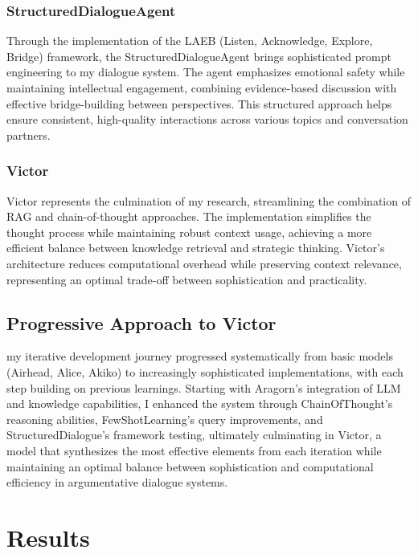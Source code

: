 \documentclass[11pt]{article}
\begin{document}
\subsubsection{StructuredDialogueAgent}
Through the implementation of the LAEB (Listen, Acknowledge, Explore, Bridge) framework, the StructuredDialogueAgent brings sophisticated prompt engineering to  my dialogue system. The agent emphasizes emotional safety while maintaining intellectual engagement, combining evidence-based discussion with effective bridge-building between perspectives. This structured approach helps ensure consistent, high-quality interactions across various topics and conversation partners.

\subsubsection{Victor}
Victor represents the culmination of  my research, streamlining the combination of RAG and chain-of-thought approaches. The implementation simplifies the thought process while maintaining robust context usage, achieving a more efficient balance between knowledge retrieval and strategic thinking. Victor's architecture reduces computational overhead while preserving context relevance, representing an optimal trade-off between sophistication and practicality.

\subsection{Progressive Approach to Victor}
 my iterative development journey progressed systematically from basic models (Airhead, Alice, Akiko) to increasingly sophisticated implementations, with each step building on previous learnings. Starting with Aragorn's integration of LLM and knowledge capabilities,  I enhanced the system through ChainOfThought's reasoning abilities, FewShotLearning's query improvements, and StructuredDialogue's framework testing, ultimately culminating in Victor, a model that synthesizes the most effective elements from each iteration while maintaining an optimal balance between sophistication and computational efficiency in argumentative dialogue systems.

\section{Results}
\end{document}
